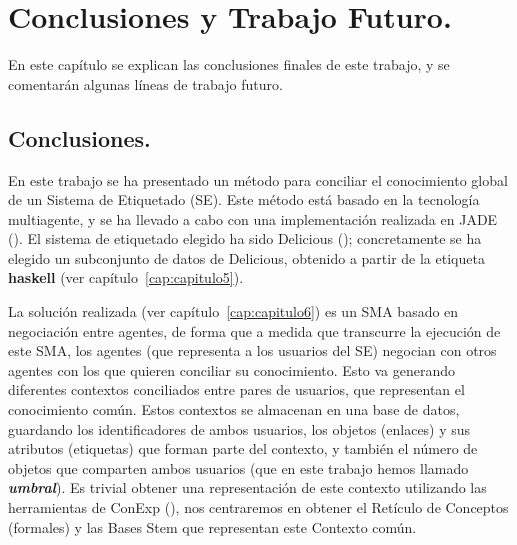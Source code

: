 \chapter{Conclusiones y Trabajo Futuro.}\label{cap:capitulo8}

En este capítulo se explican las conclusiones finales de este trabajo, y se comentarán algunas líneas de trabajo futuro.

\section{Conclusiones.}

En este trabajo se ha presentado un método para conciliar el conocimiento global de un Sistema de Etiquetado (SE). Este método está basado en la tecnología multiagente, y se ha llevado a cabo con una implementación realizada en JADE (\cite{jade}). El sistema de etiquetado elegido ha sido Delicious (\cite{delicious}); concretamente se ha elegido un subconjunto de datos de Delicious, obtenido a partir de la etiqueta {\bf haskell} (ver capítulo~\ref{cap:capitulo5}).

La solución realizada (ver capítulo~\ref{cap:capitulo6}) es un SMA basado en negociación entre agentes, de forma que a medida que transcurre la ejecución de este SMA, los agentes (que representa a los usuarios del SE) negocian con otros agentes con los que quieren conciliar su conocimiento. Esto va generando diferentes contextos conciliados entre pares de usuarios, que representan el conocimiento común. Estos contextos se almacenan en una base de datos, guardando los identificadores de ambos usuarios, los objetos (enlaces) y sus atributos (etiquetas) que forman parte del contexto, y también el número de objetos que comparten ambos usuarios (que en este trabajo hemos llamado \emph{{\bf umbral}}). Es trivial obtener una representación de este contexto utilizando las herramientas de ConExp (\cite{conexp}), nos centraremos en obtener el Retículo de Conceptos (formales) y las Bases Stem que representan este Contexto común.

